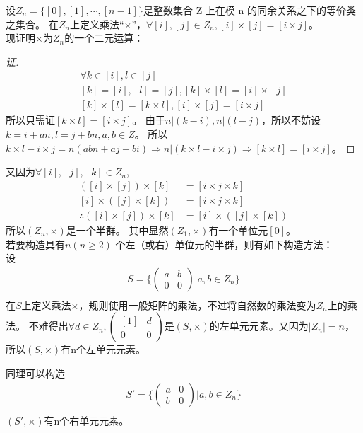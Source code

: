 \documentclass[11pt]{article}
\begin{document}
设$Z_n = \{[0], [1], \cdots, [n - 1]\}$是整数集合 Z 上在模 n 的同余关系之下的等价类之集合。
在$Z_n$上定义乘法“$\times$”，$\forall [i], [j] \in Z_n, [i] \times [j] = [i \times j]$。\\
现证明$\times$为$Z_n$的一个二元运算：
\begin{proof}[证]
  \begin{gather*}
    \forall k \in [i], l \in [j] \\
    [k] = [i], [l] = [j], [k] \times [l] = [i] \times [j] \\
    [k] \times [l] = [k \times l], [i] \times [j] = [i \times j]
  \end{gather*}
  所以只需证$[k \times l] = [i \times j]$。
  由于$n | (k - i), n | (l - j)$，所以不妨设$k = i + an, l = j + bn, a,b \in Z$。
  所以$k \times l - i \times j = n (abn + aj + bi) \Rightarrow n | (k \times l - i \times j) \Rightarrow [k \times l] = [i \times j]$。
\end{proof}
又因为$\forall [i], [j], [k] \in Z_n$,
\begin{align*}
  ([i] \times [j]) \times [k] &= [i \times j \times k] \\
  [i] \times ([j] \times [k]) &= [i \times j \times k] \\
  \therefore ([i] \times [j]) \times [k] &= [i] \times ([j] \times [k])
\end{align*}
所以$(Z_n, \times)$是一个半群。
其中显然$(Z_1, \times)$有一个单位元$[0]$。\\
若要构造具有$n(n \geq 2)$ 个左（或右）单位元的半群，则有如下构造方法：\\
设
\begin{gather*}
  S = \{ \left(
    \begin{array}{cc}
      a & b \\
      0 & 0
    \end{array}
  \right) | a, b \in Z_n \} \\
\end{gather*}
在$S$上定义乘法$\times$，规则使用一般矩阵的乘法，不过将自然数的乘法变为$Z_n$上的乘法。
不难得出$\forall d \in Z_n, \left(
  \begin{array}{cc}
    [1] & d \\
    0 & 0
  \end{array}
\right)$是$(S, \times)$的左单元元素。又因为$|Z_n| = n$，所以$(S, \times)$有n个左单元元素。

同理可以构造\begin{gather*}
  S' = \{ \left(
    \begin{array}{cc}
      a & 0 \\
      b & 0
    \end{array}
  \right) | a, b \in Z_n \} \\
\end{gather*}
$(S', \times)$有n个右单元元素。
\end{document}
